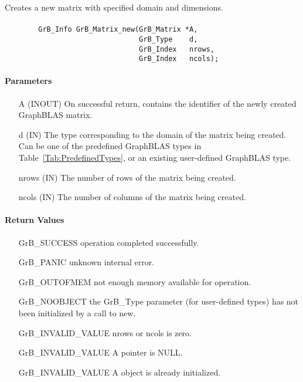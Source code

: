 Creates a new matrix with specified domain and dimensions.

\paragraph{\syntax}

\begin{verbatim}
        GrB_Info GrB_Matrix_new(GrB_Matrix *A,
                                GrB_Type    d,
                                GrB_Index   nrows,
                                GrB_Index   ncols);
\end{verbatim}

\paragraph{Parameters}

\begin{itemize}[leftmargin=1.1in]
    \item[{\sf A}] ({\sf INOUT}) On successful return, contains the identifier of 
                                 the newly created GraphBLAS matrix.
    \item[{\sf d}] ({\sf IN})    The type corresponding to the domain of the matrix 
                                 being created. Can be one of the predefined
                                 GraphBLAS types in Table~\ref{Tab:PredefinedTypes}, 
                                 or an existing user-defined GraphBLAS type.
    \item[{\sf nrows}] ({\sf IN}) The number of rows of the matrix being created.
    \item[{\sf ncols}] ({\sf IN}) The number of columns of the matrix being created.
\end{itemize}


\paragraph{Return Values}

\begin{itemize}[leftmargin=2.1in]
\item[{\sf GrB\_SUCCESS}]   operation completed successfully.
\item[{\sf GrB\_PANIC}]     unknown internal error.
\item[{\sf GrB\_OUTOFMEM}]  not enough memory available for operation.
\item[{\sf GrB\_NOOBJECT}]   the {\sf GrB\_Type} parameter (for user-defined
                             types) has not been initialized by a
                             call to {\sf new}.
\item[{\sf GrB\_INVALID\_VALUE}]    {\sf nrows} or {\sf ncols} is zero.
\item[{\sf GrB\_INVALID\_VALUE}]    {\sf A} pointer is {\sf NULL}.
\item[{\sf GrB\_INVALID\_VALUE}]    {\sf A} object is already initialized.
\end{itemize}

